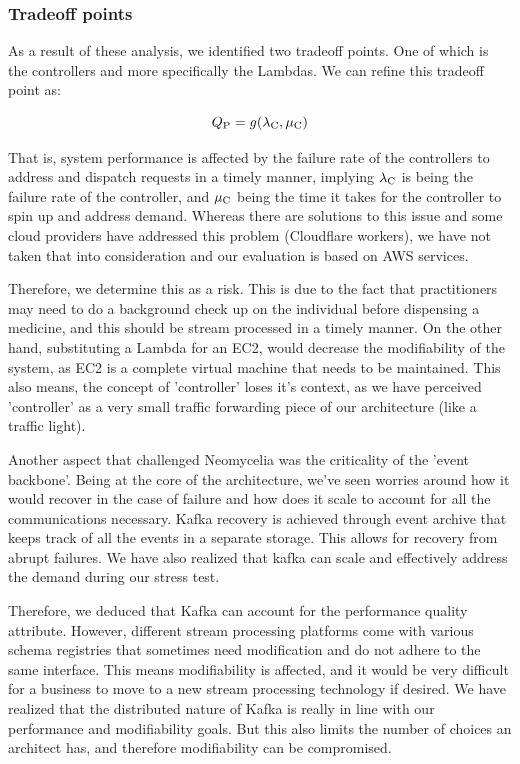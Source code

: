 \documentclass[conference]{IEEEtran}
\begin{document}
\subsubsection{Tradeoff points}

As a result of these analysis, we identified two tradeoff points. One of which is the controllers and more specifically the Lambdas. We can refine this tradeoff point as:

\begin{equation}
    Q\textsubscript{P} = g(\lambda \textsubscript{C},
    \mu \textsubscript{C})
\end{equation}

That is, system performance is affected by the failure rate of the controllers to address and dispatch requests in a timely manner, implying $ \lambda \textsubscript{C} $ is being the failure rate of the controller, and  $ \mu \textsubscript{C} $ being the time it takes for the controller to spin up and address demand. Whereas there are solutions to this issue and some cloud providers have addressed this problem (Cloudflare workers), we have not taken that into consideration and our evaluation is based on AWS services.

Therefore, we determine this as a risk. This is due to the fact that practitioners may need to do a background check up on the individual before dispensing a medicine, and this should be stream processed in a timely manner. On the other hand, substituting a Lambda for an EC2, would decrease the modifiability of the system, as EC2 is a complete virtual machine that needs to be maintained. This also means, the concept of 'controller' loses it's context, as we have perceived 'controller' as a very small traffic forwarding piece of our architecture (like a traffic light).

Another aspect that challenged Neomycelia was the criticality of the 'event backbone'. Being at the core of the architecture, we've seen worries around how it would recover in the case of failure and how does it scale to account for all the communications necessary. Kafka recovery is achieved through event archive that keeps track of all the events in a separate storage. This allows for recovery from abrupt failures. We have also realized that kafka can scale and effectively address the demand during our stress test.

Therefore, we deduced that Kafka can account for the performance quality attribute. However, different stream processing platforms come with various schema registries that sometimes need modification and do not adhere to the same interface. This means modifiability is affected, and it would be very difficult for a business to move to a new stream processing technology if desired. We have realized that the distributed nature of Kafka is really in line with our performance and modifiability goals. But this also limits the number of choices an architect has, and therefore modifiability can be compromised.
\end{document}
